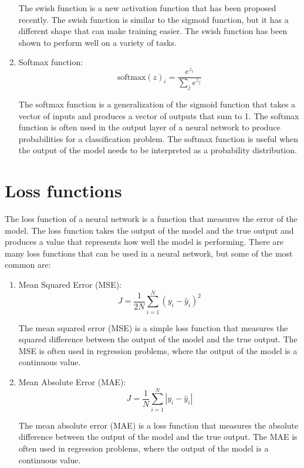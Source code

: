 \begin{enumerate}
    The swish function is a new activation function that has been proposed recently.
    The swish function is similar to the sigmoid function, but it has a different
    shape that can make training easier. The swish function has been shown to perform
    well on a variety of tasks.

    \item Softmax function:
    \begin{equation}
        \text{softmax}(z)_i = \frac{e^{z_i}}{\sum_{j} e^{z_j}}
    \end{equation}

    The softmax function is a generalization of the sigmoid function that takes a
    vector of inputs and produces a vector of outputs that sum to 1. The softmax
    function is often used in the output layer of a neural network to produce
    probabilities for a classification problem. The softmax function is useful
    when the output of the model needs to be interpreted as a probability distribution.

\end{enumerate}

\section{Loss functions}

The loss function of a neural network is a function that measures the error of the
model. The loss function takes the output of the model and the true output and
produces a value that represents how well the model is performing. There are many
loss functions that can be used in a neural network, but some of the most common
are:

\begin{enumerate}
    \item Mean Squared Error (MSE):
    \begin{equation}
        J = \frac{1}{2N} \sum_{i=1}^{N} (y_i - \hat{y}_i)^2
    \end{equation}

    The mean squared error (MSE) is a simple loss function that measures the squared
    difference between the output of the model and the true output. The MSE is often
    used in regression problems, where the output of the model is a continuous value.

    \item Mean Absolute Error (MAE):
    \begin{equation}
        J = \frac{1}{N} \sum_{i=1}^{N} |y_i - \hat{y}_i|
    \end{equation}

    The mean absolute error (MAE) is a loss function that measures the absolute
    difference between the output of the model and the true output. The MAE is often
    used in regression problems, where the output of the model is a continuous value.

\end{enumerate}

